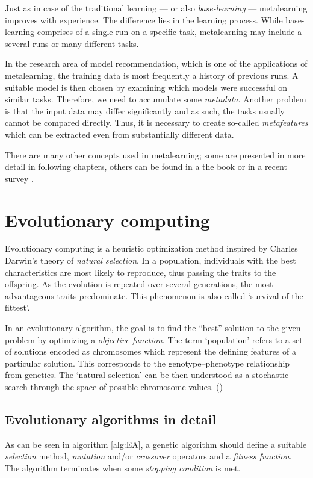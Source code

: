 Just as in case of the traditional learning --- or also \emph{base-learning}
--- metalearning improves with experience. The difference lies in the learning
process. While base-learning comprises of a single run on a specific task,
metalearning may include a several runs or many different tasks. 

In the research area of model recommendation, which is one of the applications
of metalearning, the training data is most
frequently a history of previous runs. A suitable model is then chosen by
examining which models were successful on similar tasks.
Therefore, we need to accumulate some \emph{metadata}. Another problem
is that the input data may differ significantly and as such, the tasks usually
cannot be compared directly. Thus, it is necessary to create so-called
\emph{metafeatures} which can be extracted even from substantially different
data.

There are many other concepts used in metalearning; some are presented in more
detail in following chapters, others can be found in a the book
\citep{Brazdil:2008:MAD:1507541} or in a recent survey
\citep{DBLP:journals/corr/abs-1810-03548}.

\section{Evolutionary computing} \label{ea}
Evolutionary computing is a heuristic optimization method inspired by 
Charles Darwin's theory of \emph{natural selection}. \cite{darwin} In 
a population, individuals with the best characteristics are most likely
to reproduce, thus passing the traits to the offspring. As the 
evolution is repeated over several generations, the most advantageous traits 
predominate. This phenomenon is also called `survival of the fittest'.

In an evolutionary algorithm, the goal is to find the ``best'' solution 
to the given problem by optimizing a \emph{objective function}. The term
`population' refers to a set of solutions encoded as chromosomes which 
represent the defining features of a particular solution. This corresponds
to the genotype--phenotype relationship from genetics. The `natural selection'
can be then understood as a stochastic search through the space of possible 
chromosome values. 
(\cite{Engelbrecht:2007:CII:1557464})

\subsection{Evolutionary algorithms in detail}
As can be seen in algorithm \ref{alg:EA}, a genetic algorithm should 
define a suitable \emph{selection} method, \emph{mutation} and/or 
\emph{crossover} operators and a \emph{fitness function}.
The algorithm terminates when some \emph{stopping condition} is met. 

